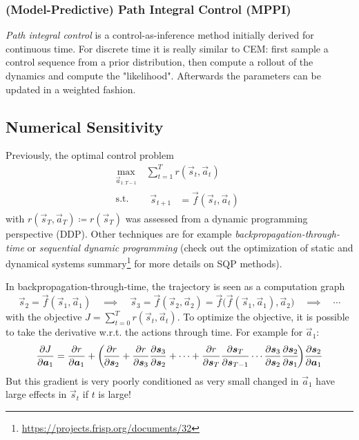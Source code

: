 			\subsubsection{(Model-Predictive) Path Integral Control (MPPI)}
				\emph{Path integral control} is a control-as-inference method initially derived for continuous time. For discrete time it is really similar to CEM: first sample a control sequence from a prior distribution, then compute a rollout of the dynamics and compute the "likelihood". Afterwards the parameters can be updated in a weighted fashion.

		\subsection{Numerical Sensitivity}
			Previously, the optimal control problem
			\begin{equation*}
				\begin{aligned}
					\max_{\vec{a}_{1:T - 1}} \,& \sum_{t = 1}^{T} r(\vec{s}_t, \vec{a}_t) \\
					\mathrm{s.t.} \quad&
						\begin{aligned}
							\vec{s}_{t + 1} &= \vec{f}(\vec{s}_t, \vec{a}_t)
						\end{aligned}
				\end{aligned}
			\end{equation*}
			with \( r(\vec{s}_T, \vec{a}_T) \coloneqq r(\vec{s}_T) \) was assessed from a dynamic programming perspective (DDP). Other techniques are for example \emph{backpropagation-through-time} or \emph{sequential dynamic programming} (check out the optimization of static and dynamical systems summary\footnote{\url{https://projects.frisp.org/documents/32}} for more details on SQP methods).

			In backpropagation-through-time, the trajectory is seen as a computation graph
			\begin{equation*}
				\vec{s}_2 = \vec{f}(\vec{s}_1, \vec{a}_1)
				\quad\implies\quad
				\vec{s}_3 = \vec{f}(\vec{s}_2, \vec{a}_2) = \vec{f}\big(\vec{f}(\vec{s}_1, \vec{a}_1), \vec{a}_2\big)
				\quad\implies\quad
				\cdots
			\end{equation*}
			with the objective \( J = \sum_{t = 0}^{T} r(\vec{s}_t, \vec{a}_t) \). To optimize the objective, it is possible to take the derivative w.r.t. the actions through time. For example for \(\vec{a}_1\):
			\begin{equation*}
				\pdv{J}{\bm{a}_1}
					= \pdv{r}{\bm{a}_1} + \bigg(\! \pdv{r}{\bm{s}_2} + \pdv{r}{\bm{s}_3} \pdv{\bm{s}_3}{\bm{s}_2} + \cdots + \pdv{r}{\bm{s}_T} \pdv{\bm{s}_T}{\bm{s}_{T - 1}} \cdots \pdv{\bm{s}_3}{\bm{s}_2} \pdv{\bm{s}_2}{\bm{s}_1} \!\bigg) \pdv{\bm{s}_2}{\bm{a}_1}
			\end{equation*}
			But this gradient is very poorly conditioned as very small changed in \(\vec{a}_1\) have large effects in \(\vec{s}_t\) if \(t\) is large!

